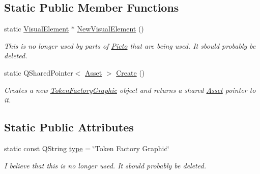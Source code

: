 \subsection*{Static Public Member Functions}
\begin{DoxyCompactItemize}
\item 
\hypertarget{class_picto_1_1_token_factory_graphic_a2cfc43cd75593d3f273a594c74b22215}{static \hyperlink{struct_picto_1_1_visual_element}{Visual\-Element} $\ast$ \hyperlink{class_picto_1_1_token_factory_graphic_a2cfc43cd75593d3f273a594c74b22215}{New\-Visual\-Element} ()}\label{class_picto_1_1_token_factory_graphic_a2cfc43cd75593d3f273a594c74b22215}

\begin{DoxyCompactList}\small\item\em This is no longer used by parts of \hyperlink{namespace_picto}{Picto} that are being used. It sbould probably be deleted. \end{DoxyCompactList}\item 
\hypertarget{class_picto_1_1_token_factory_graphic_aa901498ad885a2913491316dbc4463f7}{static Q\-Shared\-Pointer$<$ \hyperlink{class_picto_1_1_asset}{Asset} $>$ \hyperlink{class_picto_1_1_token_factory_graphic_aa901498ad885a2913491316dbc4463f7}{Create} ()}\label{class_picto_1_1_token_factory_graphic_aa901498ad885a2913491316dbc4463f7}

\begin{DoxyCompactList}\small\item\em Creates a new \hyperlink{class_picto_1_1_token_factory_graphic}{Token\-Factory\-Graphic} object and returns a shared \hyperlink{class_picto_1_1_asset}{Asset} pointer to it. \end{DoxyCompactList}\end{DoxyCompactItemize}
\subsection*{Static Public Attributes}
\begin{DoxyCompactItemize}
\item 
\hypertarget{class_picto_1_1_token_factory_graphic_aedde9b436f058570ffc63a90976f74ea}{static const Q\-String \hyperlink{class_picto_1_1_token_factory_graphic_aedde9b436f058570ffc63a90976f74ea}{type} = \char`\"{}Token Factory Graphic\char`\"{}}\label{class_picto_1_1_token_factory_graphic_aedde9b436f058570ffc63a90976f74ea}

\begin{DoxyCompactList}\small\item\em I believe that this is no longer used. It sbould probably be deleted. \end{DoxyCompactList}\end{DoxyCompactItemize}
